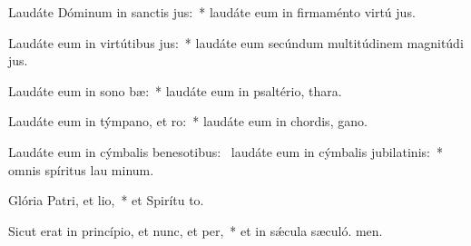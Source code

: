 \item Laudáte Dóminum in sanctis jus:~* laudáte eum in firmaménto virtú jus.
\item Laudáte eum in virtútibus jus:~* laudáte eum secúndum multitúdinem magnitúdi jus.
\item Laudáte eum in sono bæ:~* laudáte eum in psaltério,  thara.
\item Laudáte eum in týmpano, et ro:~* laudáte eum in chordis,  gano.
\item Laudáte eum in cýmbalis benesotibus:~\pscross{} laudáte eum in cýmbalis jubilatinis:~* omnis spíritus lau minum.
\item Glória Patri, et lio,~* et Spirítu to.
\item Sicut erat in princípio, et nunc, et per,~* et in sǽcula sæculó. men.
